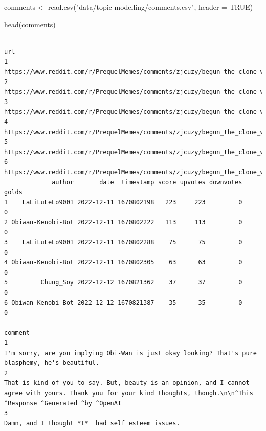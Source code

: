 \documentclass[
  letterpaper,
  DIV=11,
  numbers=noendperiod]{scrreprt}
\newenvironment{Shaded}{\begin{snugshade}}{\end{snugshade}}
\newcommand{\AttributeTok}[1]{\textcolor[rgb]{0.40,0.45,0.13}{#1}}
\newcommand{\ConstantTok}[1]{\textcolor[rgb]{0.56,0.35,0.01}{#1}}
\newcommand{\FunctionTok}[1]{\textcolor[rgb]{0.28,0.35,0.67}{#1}}
\newcommand{\NormalTok}[1]{\textcolor[rgb]{0.00,0.23,0.31}{#1}}
\newcommand{\OtherTok}[1]{\textcolor[rgb]{0.00,0.23,0.31}{#1}}
\newcommand{\StringTok}[1]{\textcolor[rgb]{0.13,0.47,0.30}{#1}}
\begin{document}
\begin{Shaded}
\begin{Highlighting}[]
\NormalTok{comments }\OtherTok{\textless{}{-}} \FunctionTok{read.csv}\NormalTok{(}\StringTok{"data/topic{-}modelling/comments.csv"}\NormalTok{, }\AttributeTok{header =} \ConstantTok{TRUE}\NormalTok{)}

\FunctionTok{head}\NormalTok{(comments)}
\end{Highlighting}
\end{Shaded}

\begin{verbatim}
                                                                             url
1 https://www.reddit.com/r/PrequelMemes/comments/zjcuzy/begun_the_clone_war_has/
2 https://www.reddit.com/r/PrequelMemes/comments/zjcuzy/begun_the_clone_war_has/
3 https://www.reddit.com/r/PrequelMemes/comments/zjcuzy/begun_the_clone_war_has/
4 https://www.reddit.com/r/PrequelMemes/comments/zjcuzy/begun_the_clone_war_has/
5 https://www.reddit.com/r/PrequelMemes/comments/zjcuzy/begun_the_clone_war_has/
6 https://www.reddit.com/r/PrequelMemes/comments/zjcuzy/begun_the_clone_war_has/
             author       date  timestamp score upvotes downvotes golds
1    LaLiLuLeLo9001 2022-12-11 1670802198   223     223         0     0
2 Obiwan-Kenobi-Bot 2022-12-11 1670802222   113     113         0     0
3    LaLiLuLeLo9001 2022-12-11 1670802288    75      75         0     0
4 Obiwan-Kenobi-Bot 2022-12-11 1670802305    63      63         0     0
5         Chung_Soy 2022-12-12 1670821362    37      37         0     0
6 Obiwan-Kenobi-Bot 2022-12-12 1670821387    35      35         0     0
                                                                                                                                                                                                                                             comment
1                                                                                                                                                   I'm sorry, are you implying Obi-Wan is just okay looking? That's pure blasphemy, he's beautiful.
2                                                                          That is kind of you to say. But, beauty is an opinion, and I cannot agree with yours. Thank you for your kind thoughts, though.\n\n^This ^Response ^Generated ^by ^OpenAI
3                                                                                                                                                                                                   Damn, and I thought *I*  had self esteem issues.

\end{verbatim}
\end{document}
